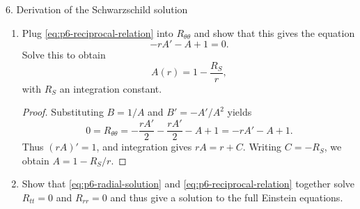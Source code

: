 \documentclass[11pt]{article}
\begin{document}
\begin{problem}{6. Derivation of the Schwarzschild solution}
\begin{enumerate}[label=(\alph*)]
          \begin{proof}
            The indicated combination gives
            \begin{equation}
              \label{eq:p6-combination}
              0=\frac BA R_{tt}+R_{rr}
              =\frac1r\left(\frac{A'}A+\frac{B'}B\right).
            \end{equation}
            We note that since \( (AB)^{\prime} = AB^{\prime} + A^{\prime}B \), \cref{eq:p6-combination} can be written as \( (AB)^{\prime}/AB \).
            Hence \((AB)'=0\), so \(AB=c\) and \(B=c/A\). Taking \(r\to\infty\) gives \(c=1\), and therefore \(B=1/A\).
          \end{proof}
		\item Plug \cref{eq:p6-reciprocal-relation} into \(R_{\theta\theta}\) and show that this gives the equation
		      \begin{equation}
			      \label{eq:p6-radial-equation}
			      -rA'-A+1=0.
		      \end{equation}
		      Solve this to obtain
		      \begin{equation}
			      \label{eq:p6-radial-solution}
			      A(r)=1-\frac{R_S}r,
		      \end{equation}
		      with \(R_S\) an integration constant.

          \begin{proof}
            Substituting \(B=1/A\) and \(B'=-A'/A^2\) yields
            \begin{equation}
              \label{eq:p6-angular-reduced}
              0=R_{\theta\theta}=-\frac{rA'}2-\frac{rA'}2-A+1
              =-rA'-A+1.
            \end{equation}
            Thus \((rA)'=1\), and integration gives \(rA=r+C\). Writing \(C=-R_S\), we obtain \(A=1-R_S/r\).
          \end{proof}
		\item Show that \cref{eq:p6-radial-solution} and \cref{eq:p6-reciprocal-relation} together solve \(R_{tt}=0\) and \(R_{rr}=0\) and thus give a solution to the full Einstein equations.


\end{enumerate}
\end{problem}
\end{document}
